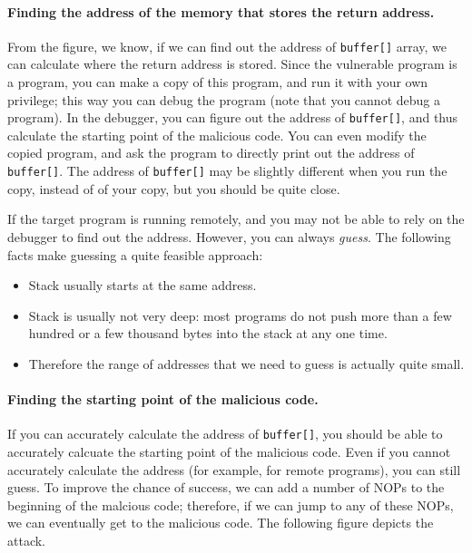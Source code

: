 \paragraph{Finding the address of the memory that stores the return address.}
From the figure, we know, if we can find out the address of {\tt buffer[]} array, 
we can calculate where the return address is stored. 
Since the vulnerable program is a \setuid program, you can make a copy of this program,
and run it with your own privilege; this way you can debug the program (note that
you cannot debug a \setuid program). In the debugger, you can figure out
the address of {\tt buffer[]}, and thus calculate the starting point of
the malicious code. You can even modify the copied program, and ask the 
program to directly print out the address of {\tt buffer[]}.
The address of {\tt buffer[]} may be slightly
different when you run the \setuid copy, instead of of your copy, but
you should be quite close. 


If the target program is running remotely, and you may not be able to
rely on the debugger to find out the address. However, you can always
{\em guess}. The following facts make guessing a quite feasible approach:
      \begin{itemize}
      \item Stack usually starts at the same address.
      \item Stack is usually not very deep: most programs do not push more than
            a few hundred or a few thousand bytes into the stack at any one time.
      \item Therefore the range of addresses that we need to guess is actually
            quite small.
      \end{itemize}



\paragraph{Finding the starting point of the malicious code.}
If you can accurately calculate the address of {\tt buffer[]}, you should be 
able to accurately calcuate the starting point of the malicious code.
Even if you cannot accurately calculate the address (for example, for remote programs),
you can still guess. To improve the chance of success, we can add a
number of NOPs to the beginning of the malcious code; therefore, if we 
can jump to any of these NOPs, we can eventually get to the 
malicious code. The following figure depicts the attack.



